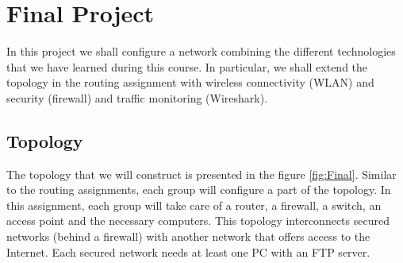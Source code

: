 \chapter{Final Project}

In this project we shall configure a network combining the different technologies that we have learned during this course. In particular, we shall extend the topology in the routing assignment with wireless connectivity (WLAN) and security (firewall) and traffic monitoring (Wireshark).

\section{Topology}

The topology that we will construct is presented in the figure \ref{fig:Final}. Similar to the routing assignments, each group will configure a part of the topology. In this assignment, each group will take care of a router, a firewall, a switch, an access point and the necessary computers. This topology interconnects secured networks (behind a firewall) with another network that offers access to the Internet. Each secured network needs at least one PC with an FTP server.

